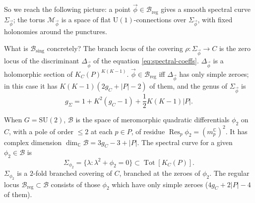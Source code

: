 \documentclass[12pt,letterpaper,reqno]{article}
\numberwithin{equation}{section}
\newcommand{\cB}{\ensuremath{\mathcal B}}
\newcommand{\cM}{\ensuremath{\mathcal M}}
\newcommand{\R}{\ensuremath{\mathbb R}}
\newcommand{\C}{\ensuremath{\mathbb C}}
\newcommand{\half}{\ensuremath{\frac{1}{2}}}
\newcommand{\I}{{\mathrm i}}
\newcommand{\sing}{\mathrm{sing}}
\newcommand{\reg}{\mathrm{reg}}
\newcommand{\abs}[1]{\lvert#1\rvert}
\newcommand{\vphi}{{\vec\phi}}
\newcommand{\ti}[1]{\textit{#1}}
\DeclareMathOperator{\Res}{Res}
\DeclareMathOperator{\Tot}{Tot}
\newcommand{\SU}{\mathrm{SU}}
\newcommand{\U}{\mathrm{U}}
\begin{document}
So we reach the following picture: a point $\vphi \in \cB_\reg$
gives a smooth spectral curve $\Sigma_\vphi$; the torus
$\cM_\vphi$ is a space of flat $\U(1)$-connections
over $\Sigma_\vphi$, with fixed holonomies around the
punctures.



\begin{remark}
What is $\cB_\sing$ concretely?
The branch locus of the covering $\rho: \Sigma_\vphi \to C$ 
is the zero locus of the discriminant $\Delta_{\vphi}$ of the equation \eqref{eq:spectral-coeffs}. $\Delta_\vphi$ 
is a holomorphic section of $K_C(P)^{K(K-1)}$.
$\vphi \in \cB_\reg$ iff $\Delta_\vphi$ has only simple zeroes; in this case
it has $K(K-1)(2g_C+\abs{P}-2)$ of them, and the genus of $\Sigma_\vphi$ is
\begin{equation}
g_\Sigma = 1 + K^2(g_C - 1) + \half K(K-1) \abs{P}.
\end{equation}
\end{remark}

\begin{example}[Hitchin base and spectral curves for $G = \SU(2)$]
When $G = \SU(2)$, $\cB$ is the space of meromorphic quadratic
differentials $\phi_2$ on $C$, with a pole of order $\le 2$ at 
each $p \in P$, of residue $\Res_p \phi_2 = (m_p^\C)^2$.
It has complex dimension
$\dim_\C \cB = 3 g_C - 3 + \abs{P}$. 
The spectral curve for a given $\phi_2 \in \cB$
is
\begin{equation}
  \Sigma_{\phi_2} = \{\lambda: \lambda^2 + \phi_2 = 0\} \subset \Tot[K_C(P)].
\end{equation}
$\Sigma_{\phi_2}$ is a $2$-fold branched covering of $C$, branched at the zeroes of $\phi_2$.
The regular locus $\cB_\reg \subset \cB$ consists of those $\phi_2$ which have only simple zeroes ($4 g_C + 2\abs{P} - 4$ of them).
\end{example}
\end{document}
